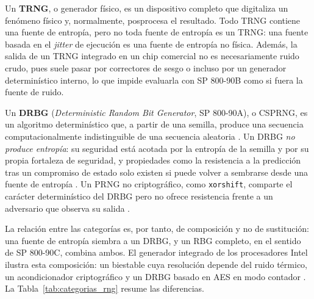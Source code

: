 Un \textbf{TRNG}, o generador físico, es un dispositivo completo que digitaliza un fenómeno físico y, normalmente, posprocesa el resultado. Todo TRNG contiene una fuente de entropía, pero no toda fuente de entropía es un TRNG: una fuente basada en el \textit{jitter} de ejecución es una fuente de entropía no física. Además, la salida de un TRNG integrado en un chip comercial no es necesariamente ruido crudo, pues suele pasar por correctores de sesgo o incluso por un generador determinístico interno, lo que impide evaluarla con SP 800-90B como si fuera la fuente de ruido.

Un \textbf{DRBG} (\textit{Deterministic Random Bit Generator}, SP 800-90A), o CSPRNG, es un algoritmo determinístico que, a partir de una semilla, produce una secuencia computacionalmente indistinguible de una secuencia aleatoria \cite{Barker2015RecommendationGenerators}. Un DRBG \emph{no produce entropía}: su seguridad está acotada por la entropía de la semilla y por su propia fortaleza de seguridad, y propiedades como la resistencia a la predicción tras un compromiso de estado solo existen si puede volver a sembrarse desde una fuente de entropía \cite{Dodis2013NotRobust}. Un PRNG no criptográfico, como \texttt{xorshift}, comparte el carácter determinístico del DRBG pero no ofrece resistencia frente a un adversario que observa su salida \cite{Kelsey1998PRNGAttacks}.

La relación entre las categorías es, por tanto, de composición y no de sustitución: una fuente de entropía siembra a un DRBG, y un RBG completo, en el sentido de SP 800-90C, combina ambos. El generador integrado de los procesadores Intel ilustra esta composición: un biestable cuya resolución depende del ruido térmico, un acondicionador criptográfico y un DRBG basado en AES en modo contador \cite{Hamburg2012IvyBridge}. La Tabla~\ref{tab:categorias_rng} resume las diferencias.

